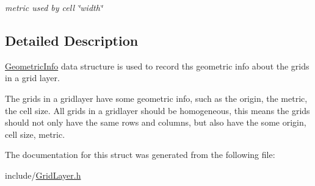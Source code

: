 \begin{DoxyCompactItemize}
\begin{DoxyCompactList}\small\item\em metric used by cell \char`\"{}width\char`\"{} \end{DoxyCompactList}\end{DoxyCompactItemize}


\subsection{\-Detailed \-Description}
\hyperlink{structGeometricInfo}{\-Geometric\-Info} data structure is used to record ths geometric info about the grids in a grid layer. 

\-The grids in a gridlayer have some geometric info, such as the origin, the metric, the cell size. \-All grids in a gridlayer should be homogeneous, this means the grids should not only have the same rows and columns, but also have the some origin, cell size, metric. 

\-The documentation for this struct was generated from the following file\-:\begin{DoxyCompactItemize}
\item 
include/\hyperlink{GridLayer_8h}{\-Grid\-Layer.\-h}\end{DoxyCompactItemize}
